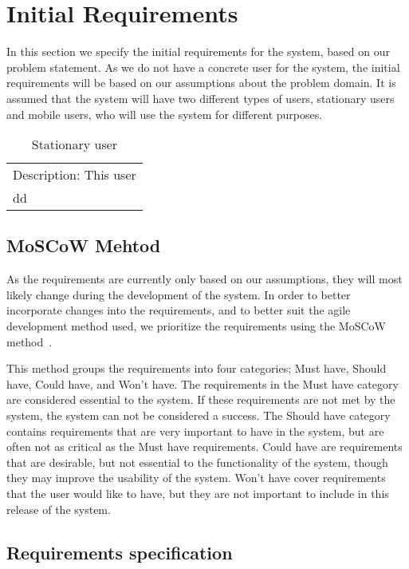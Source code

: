 \section{Initial Requirements}\label{sec:s1_requirements}
In this section we specify the initial requirements for the system, based on our problem statement. As we do not have a concrete user for the system, the initial requirements will be based on our assumptions about the problem domain. It is assumed that the system will have two different types of users, stationary users and mobile users, who will use the system for different purposes.

\begin{table}[h!]
    \centering
    \begin{tabularx}{250pt}{l}
        \toprule
        \beign{c\textbf{Stationary user} \\ \midrule
        Description: This user \\
        dd \\
        \bottomrule
    \end{tabularx}
    \caption{Stationary user}
    \label{tab:sss}
\end{table}


\subsection{MoSCoW Mehtod}
As the requirements are currently only based on our assumptions, they will most likely change during the development of the system. In order to better incorporate changes into the requirements, and to better suit the agile development method used, we prioritize the requirements using the MoSCoW method~\cite{moscow}.

This method groups the requirements into four categories; Must have, Should have, Could have, and Won't have. The requirements in the Must have category are considered essential to the system. If these requirements are not met by the system, the system can not be considered a success. The Should have category contains requirements that are very important to have in the system, but are often not as critical as the Must have requirements. Could have are requirements that are desirable, but not essential to the functionality of the system, though they may improve the usability of the system. Won't have cover requirements that the user would like to have, but they are not important to include in this release of the system.

\subsection{Requirements specification}

